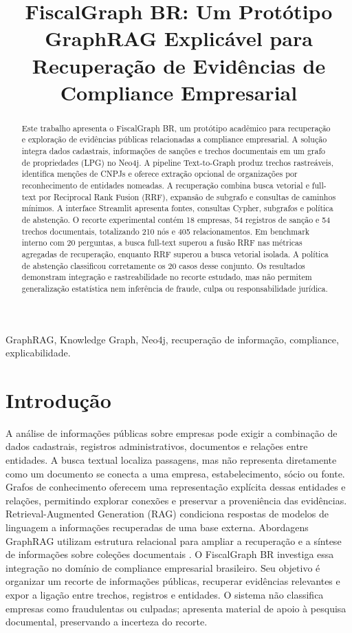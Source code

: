 \documentclass[conference]{IEEEtran}
\title{FiscalGraph BR: Um Protótipo GraphRAG Explicável para Recuperação de Evidências de Compliance Empresarial}
\author{
\IEEEauthorblockN{[Nome do Integrante 1], [Nome do Integrante 2], [Nome do Integrante 3]}
\IEEEauthorblockA{[Instituição] \\ [Curso e disciplina] \\ [E-mails institucionais]}
}
\begin{document}
\maketitle
\begin{abstract}
Este trabalho apresenta o FiscalGraph BR, um protótipo acadêmico para recuperação e exploração de evidências públicas relacionadas a compliance empresarial. A solução integra dados cadastrais, informações de sanções e trechos documentais em um grafo de propriedades (LPG) no Neo4j. A pipeline Text-to-Graph produz trechos rastreáveis, identifica menções de CNPJs e oferece extração opcional de organizações por reconhecimento de entidades nomeadas. A recuperação combina busca vetorial e full-text por Reciprocal Rank Fusion (RRF), expansão de subgrafo e consultas de caminhos mínimos. A interface Streamlit apresenta fontes, consultas Cypher, subgrafos e política de abstenção. O recorte experimental contém 18 empresas, 54 registros de sanção e 54 trechos documentais, totalizando 210 nós e 405 relacionamentos. Em benchmark interno com 20 perguntas, a busca full-text superou a fusão RRF nas métricas agregadas de recuperação, enquanto RRF superou a busca vetorial isolada. A política de abstenção classificou corretamente os 20 casos desse conjunto. Os resultados demonstram integração e rastreabilidade no recorte estudado, mas não permitem generalização estatística nem inferência de fraude, culpa ou responsabilidade jurídica.
\end{abstract}
\begin{IEEEkeywords}
GraphRAG, Knowledge Graph, Neo4j, recuperação de informação, compliance, explicabilidade.
\end{IEEEkeywords}
\section{Introdução}
A análise de informações públicas sobre empresas pode exigir a combinação de dados cadastrais, registros administrativos, documentos e relações entre entidades. A busca textual localiza passagens, mas não representa diretamente como um documento se conecta a uma empresa, estabelecimento, sócio ou fonte. Grafos de conhecimento oferecem uma representação explícita dessas entidades e relações, permitindo explorar conexões e preservar a proveniência das evidências.
Retrieval-Augmented Generation (RAG) condiciona respostas de modelos de linguagem a informações recuperadas de uma base externa. Abordagens GraphRAG utilizam estrutura relacional para ampliar a recuperação e a síntese de informações sobre coleções documentais \cite{edge2024}. O FiscalGraph BR investiga essa integração no domínio de compliance empresarial brasileiro. Seu objetivo é organizar um recorte de informações públicas, recuperar evidências relevantes e expor a ligação entre trechos, registros e entidades. O sistema não classifica empresas como fraudulentas ou culpadas; apresenta material de apoio à pesquisa documental, preservando a incerteza do recorte.
\end{document}

